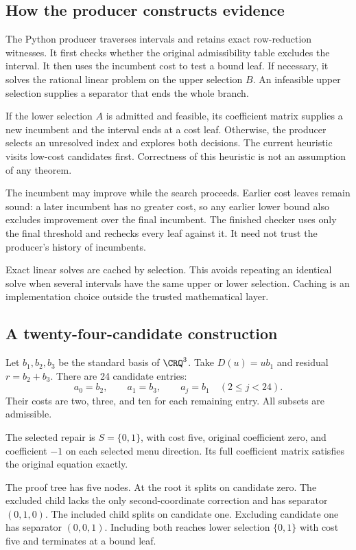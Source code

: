 \subsection{How the producer constructs evidence}

The Python producer traverses intervals and retains exact row-reduction witnesses. It first checks whether the original admissibility table excludes the interval. It then uses the incumbent cost to test a bound leaf. If necessary, it solves the rational linear problem on the upper selection $B$. An infeasible upper selection supplies a separator that ends the whole branch.

If the lower selection $A$ is admitted and feasible, its coefficient matrix supplies a new incumbent and the interval ends at a cost leaf. Otherwise, the producer selects an unresolved index and explores both decisions. The current heuristic visits low-cost candidates first. Correctness of this heuristic is not an assumption of any theorem.

The incumbent may improve while the search proceeds. Earlier cost leaves remain sound: a later incumbent has no greater cost, so any earlier lower bound also excludes improvement over the final incumbent. The finished checker uses only the final threshold and rechecks every leaf against it. It need not trust the producer's history of incumbents.

Exact linear solves are cached by selection. This avoids repeating an identical solve when several intervals have the same upper or lower selection. Caching is an implementation choice outside the trusted mathematical layer.

\subsection{A twenty-four-candidate construction}

Let $b_1,b_2,b_3$ be the standard basis of $\CRQ^3$. Take $D(u)=ub_1$ and residual $r=b_2+b_3$. There are 24 candidate entries:
\[
 a_0=b_2,\qquad a_1=b_3,\qquad a_j=b_1\quad(2\leq j<24).
\]
Their costs are two, three, and ten for each remaining entry. All subsets are admissible.

The selected repair is $S=\{0,1\}$, with cost five, original coefficient zero, and coefficient $-1$ on each selected menu direction. Its full coefficient matrix satisfies the original equation exactly.

The proof tree has five nodes. At the root it splits on candidate zero. The excluded child lacks the only second-coordinate correction and has separator $(0,1,0)$. The included child splits on candidate one. Excluding candidate one has separator $(0,0,1)$. Including both reaches lower selection $\{0,1\}$ with cost five and terminates at a bound leaf.

